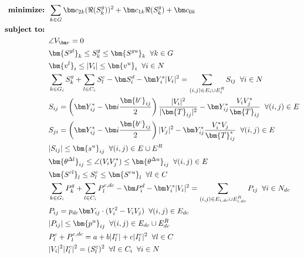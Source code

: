 \documentclass{article}
\begin{document}
\begin{align}
\mbox{\bf minimize: } & \sum_{k \in G} \bm c_{2k} (\Re(S^g_k))^2 + \bm c_{1k}\Re(S^g_k) + \bm c_{0k} \\
%
\mbox{\bf subject to: } & \nonumber \\
& \angle V_{\bm r} = 0 \\
& \bm {S^{gl}}_k \leq S^g_k \leq \bm {S^{gu}}_k \;\; \forall k \in G  \\
& \bm {v^l}_i \leq |V_i| \leq \bm {v^u}_i \;\; \forall i \in N \\
& \sum_{\substack{k \in G_i}} S^g_k + \sum_{\substack{l \in C_i}} S^c_l - {\bm S^d_i} - \bm Y^s_{i} |V_i|^2 = \sum_{\substack{(i,j)\in E_i \cup E_i^R}} S_{ij} \;\; \forall i\in N \\ 
& S_{ij} = \left( \bm Y^*_{ij} - \bm i\frac{\bm {b^c}_{ij}}{2} \right) \frac{|V_i|^2}{|\bm{T}_{ij}|^2} - \bm Y^*_{ij} \frac{V_i V^*_j}{\bm{T}_{ij}} \;\; \forall (i,j)\in E \\
& S_{ji} = \left( \bm Y^*_{ij} - \bm i\frac{\bm {b^c}_{ij}}{2} \right) |V_j|^2 - \bm Y^*_{ij} \frac{V^*_i V_j}{\bm{T}^*_{ij}} \;\; \forall (i,j)\in E \\
& |S_{ij}| \leq \bm {s^u}_{ij} \;\; \forall (i,j) \in E \cup E^R \\
& \bm {\theta^{\Delta l}}_{ij} \leq \angle (V_i V^*_j) \leq \bm {\theta^{\Delta u}}_{ij} \;\; \forall (i,j) \in E \\
& \bm {S^{cl}}_l \leq S^c_l \leq \bm {S^{cu}}_l \;\; \forall l \in C  \\
& \sum_{\substack{k \in G_i}} P^g_k + \sum_{\substack{l \in C_i}} P^{c, dc}_l - {\bm P^d_i} - \bm Y^s_{i} |V_i|^2 = \sum_{\substack{(i,j)\in E_{i, dc} \cup E_{i, dc}^R}} P_{ij} \;\; \forall i\in N_{dc} \\
& P_{ij} =  p_{dc} \bm Y_{ij} \cdot( V_i^2 - V_i V_j) \;\; \forall (i,j)\in E_{dc} \\
& |P_{ij}| \leq \bm {p^u}_{ij} \;\; \forall (i,j) \in E_{dc} \cup E_{dc}^R \\
& P^c_l + P^{c, dc}_l = a + b |I^c_l| + c |I^c_l|^2  \;\; \forall l \in C \\
& |V_i|^2 |I^c_l|^2 = (S^c_l)^2 \;\; \forall l \in C_i \;\; \forall i \in N \\
%
\end{align}
\end{document}
